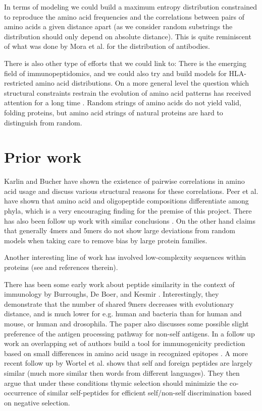 \documentclass[superscriptaddress,twocolumn,pre]{revtex4}
\newcommand{\<}{\langle}
\renewcommand{\>}{\rangle}
\begin{document}
In terms of modeling we could build a maximum entropy distribution constrained to reproduce the amino acid frequencies and the correlations between pairs of amino acids a given distance apart (as we consider random substrings the distribution should only depend on absolute distance). This is quite reminiscent of what was done by Mora et al. \cite{Mora2010} for the distribution of antibodies.

There is also other type of efforts that we could link to: There is the emerging field of immunopeptidomics, and we could also try and build models for HLA-restricted amino acid distributions.
On a more general level the question which structural constraints restrain the evolution of amino acid patterns has received attention for a long time \cite{Turjanski2018}. Random strings of amino acids do not yield valid, folding proteins, but amino acid strings of natural proteins are hard to distinguish from random.


\section{Prior work}

Karlin and Bucher \cite{Karlin1992} have shown the existence of pairwise correlations in amino acid usage and discuss various structural reasons for these correlations. Peer et al. \cite{Peer2004} have shown that amino acid and oligopeptide compositions differentiate among phyla, which is a very encouraging finding for the premise of this project. There has also been follow up work with similar conclusions \cite{Bogatyreva2006}. On the other hand \cite{Lavelle2009} claims that generally 4mers and 5mers do not show large deviations from random models when taking care to remove bias by large protein families.

Another interesting line of work has involved low-complexity sequences within proteins (see \cite{Cascarina2018} and references therein).

There has been some early work about peptide similarity in the context of immunology by Burroughs, De Boer, and Kesmir \cite{Burroughs2004}. Interestingly, they demonstrate that the number of shared 9mers decreases with evolutionary distance, and is much lower for e.g. human and bacteria than for human and mouse, or human and drosophila. The paper also discusses some possible slight preference of the antigen processing pathway for non-self antigens. In a follow up work an overlapping set of authors build a tool for immunogenicity prediction based on small differences in amino acid usage in recognized epitopes \cite{Calis2013}. A more recent follow up by Wortel et al. \cite{Wortel2018} shows that self and foreign peptides are largely similar (much more similar then words from different languages). They then argue that under these conditions thymic selection should minimizie the co-occurrence of similar self-peptides for efficient self/non-self discrimination based on negative selection. 
\end{document}
